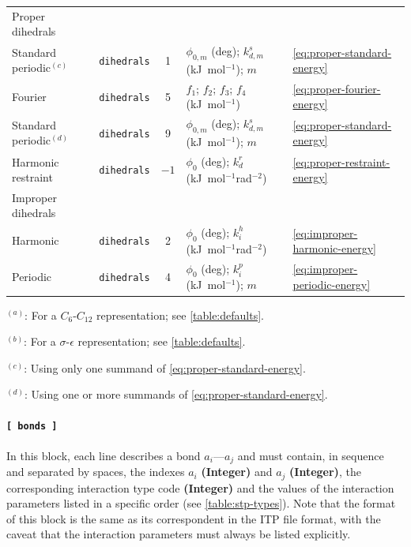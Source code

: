 \documentclass[10pt,a4paper,openany]{memoir}
\numberwithin{equation}{section}
\begin{document}
\begin{table}[tb]
\begin{tabular}{lccp{49ex}l}
Proper dihedrals &  &  &  & \\
\hspace{1ex} Standard periodic$^{(c)}$  & \texttt{dihedrals} &  1 & \(\phi_{0,m}\) (deg); \(k_{d,m}^s\) (kJ~mol$^{-1}$); \(m\) & \autoref{eq:proper-standard-energy}\\
\hspace{1ex} Fourier & \texttt{dihedrals} &  5 & \(f_1\); \(f_2\); \(f_3\); \(f_4\) (kJ~mol$^{-1}$) & \autoref{eq:proper-fourier-energy}\\
    \hspace{1ex} Standard periodic$^{(d)}$  & \texttt{dihedrals} &  9 & \(\phi_{0,m}\) (deg); \(k_{d,m}^s\) (kJ~mol$^{-1}$); \(m\) & \autoref{eq:proper-standard-energy}\\
    \hspace{1ex} Harmonic restraint & \texttt{dihedrals} &  \(-1\) & \(\phi_{0}\) (deg); \(k_{d}^r\) (kJ~mol$^{-1}$rad$^{-2}$) & \autoref{eq:proper-restraint-energy}\\
\hline
Improper dihedrals & &  &  & \\
\hspace{1ex} Harmonic & \texttt{dihedrals} &  2 & \(\phi_{0}\) (deg); \(k_i^h\) (kJ~mol$^{-1}$rad$^{-2}$)& \autoref{eq:improper-harmonic-energy}\\
\hspace{1ex} Periodic & \texttt{dihedrals} &  4 & \(\phi_{0}\) (deg); \(k_{i}^p\) (kJ~mol$^{-1}$); \(m\) & \autoref{eq:improper-periodic-energy}\\
\bottomrule
  \end{tabular}
  \vspace{1ex}\par
  {\footnotesize $^{(a)}$: For a $C_6$-$C_{12}$ representation; see \autoref{table:defaults}. \par $^{(b)}$: For a $\sigma$-$\epsilon$ representation; see \autoref{table:defaults}. \par $^{(c)}$: Using only one summand of \autoref{eq:proper-standard-energy}. \par $^{(d)}$: Using one or more summands of \autoref{eq:proper-standard-energy}.}
\end{table}

\paragraph{\texttt{[~bonds~]}}

In this block, each line describes a bond $a_i$---$a_j$ and must
contain, in sequence and separated by spaces, the indexes $a_i$
\textbf{(Integer)} and $a_j$ \textbf{(Integer)}, the corresponding
interaction type code \textbf{(Integer)} and the values of the
interaction parameters listed in a specific order (see
\autoref{table:stp-types}). Note that the format of this block is the
same as its correspondent in the ITP file format, with the caveat that
the interaction parameters must always be listed explicitly.
\end{document}
